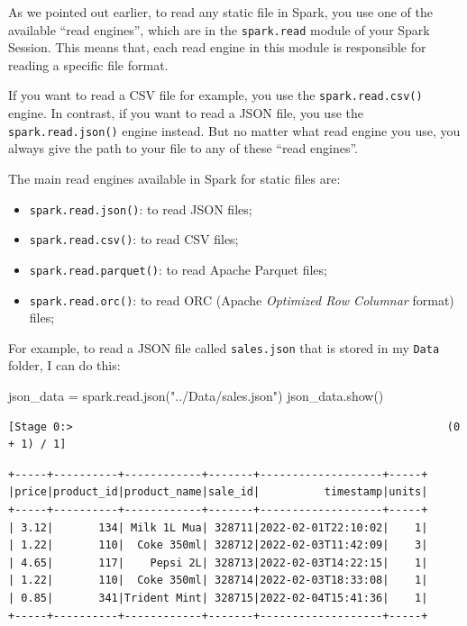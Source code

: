 \documentclass[
  11pt,
  letterpaper,
  DIV=11,
  numbers=noendperiod]{scrreprt}
\newenvironment{Shaded}{\begin{snugshade}}{\end{snugshade}}
\newcommand{\NormalTok}[1]{\textcolor[rgb]{0.00,0.23,0.31}{#1}}
\newcommand{\OperatorTok}[1]{\textcolor[rgb]{0.37,0.37,0.37}{#1}}
\newcommand{\StringTok}[1]{\textcolor[rgb]{0.13,0.47,0.30}{#1}}
\providecommand{\tightlist}{%
  \setlength{\itemsep}{0pt}\setlength{\parskip}{0pt}}\usepackage{longtable,booktabs,array}
\begin{document}
As we pointed out earlier, to read any static file in Spark, you use one
of the available ``read engines'', which are in the \texttt{spark.read}
module of your Spark Session. This means that, each read engine in this
module is responsible for reading a specific file format.

If you want to read a CSV file for example, you use the
\texttt{spark.read.csv()} engine. In contrast, if you want to read a
JSON file, you use the \texttt{spark.read.json()} engine instead. But no
matter what read engine you use, you always give the path to your file
to any of these ``read engines''.

The main read engines available in Spark for static files are:

\begin{itemize}
\tightlist
\item
  \texttt{spark.read.json()}: to read JSON files;
\item
  \texttt{spark.read.csv()}: to read CSV files;
\item
  \texttt{spark.read.parquet()}: to read Apache Parquet files;
\item
  \texttt{spark.read.orc()}: to read ORC (Apache \emph{Optimized Row
  Columnar} format) files;
\end{itemize}

For example, to read a JSON file called \texttt{sales.json} that is
stored in my \texttt{Data} folder, I can do this:

\begin{Shaded}
\begin{Highlighting}[]
\NormalTok{json\_data }\OperatorTok{=}\NormalTok{ spark.read.json(}\StringTok{"../Data/sales.json"}\NormalTok{)}
\NormalTok{json\_data.show()}
\end{Highlighting}
\end{Shaded}

\begin{verbatim}
[Stage 0:>                                                          (0 + 1) / 1]                                                                                
\end{verbatim}

\begin{verbatim}
+-----+----------+------------+-------+-------------------+-----+
|price|product_id|product_name|sale_id|          timestamp|units|
+-----+----------+------------+-------+-------------------+-----+
| 3.12|       134| Milk 1L Mua| 328711|2022-02-01T22:10:02|    1|
| 1.22|       110|  Coke 350ml| 328712|2022-02-03T11:42:09|    3|
| 4.65|       117|    Pepsi 2L| 328713|2022-02-03T14:22:15|    1|
| 1.22|       110|  Coke 350ml| 328714|2022-02-03T18:33:08|    1|
| 0.85|       341|Trident Mint| 328715|2022-02-04T15:41:36|    1|
+-----+----------+------------+-------+-------------------+-----+
\end{verbatim}
\end{document}
